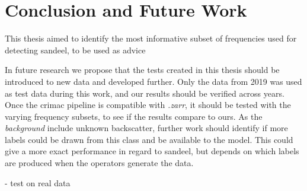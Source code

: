 \chapter{Conclusion and Future Work}
    This thesis aimed to identify the most informative subset of frequencies used for detecting sandeel, to be used as advice 
    
    
    

    
    In future research we propose that the tests created in this thesis should be introduced to new data and developed further. Only the data from 2019 was used as test data during this work, and our results should be verified across years. Once the \gls{crimac} pipeline is compatible with \textit{.zarr}, it should be tested with the varying frequency subsets, to see if the results compare to ours. As the \textit{background} include unknown backscatter, further work should identify if more labels could be drawn from this class and be available to the model. This could give a more exact performance in regard to sandeel, but depends on which labels are produced when the operators generate the data.
    
    - test on real data
    
    
    
    
 